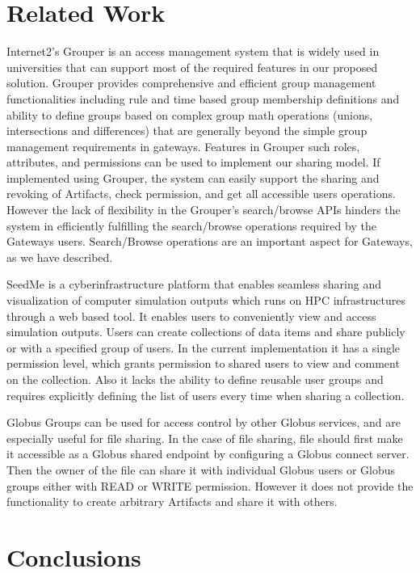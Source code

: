 \documentclass[sigconf]{acmart}
\begin{document}
\section{Related Work}

Internet2's Grouper \cite{grouperWebsite} is an access management system that is widely used in universities that can support most of the required features in our proposed solution. Grouper provides comprehensive and efficient group management functionalities including rule and time based group membership definitions and ability to define groups based on complex group math operations (unions, intersections and differences) that are generally beyond the simple group management requirements in gateways. Features in Grouper such roles, attributes, and permissions can be used to implement our sharing model. If implemented using Grouper, the system can easily support the sharing and revoking of Artifacts, check permission, and get all accessible users operations. However the lack of flexibility in the Grouper's search/browse APIs hinders the system in efficiently fulfilling the search/browse operations required by the Gateways users. Search/Browse operations are an important aspect for Gateways, as we have described.

SeedMe \cite{chourasia2013seedme} is a cyberinfrastructure platform that enables seamless sharing and visualization of computer simulation outputs which runs on HPC infrastructures through a web based tool. It enables users to conveniently view and access simulation outputs. Users can create collections of data items and share publicly or with a specified group of users. In the current implementation it has a single permission level, which grants permission to shared users to view and comment on the collection. Also it lacks the ability to define reusable user groups and requires explicitly defining the list of users every time when sharing a collection.

Globus Groups \cite{globusFileSharing} can be used for access control by other Globus services, and are especially useful for file sharing. In the case of file sharing, file should first make it accessible as a Globus shared endpoint by configuring a Globus connect server. Then the owner of the file can share it with individual Globus users or Globus groups either with READ or WRITE permission. However it does not provide the functionality to create arbitrary Artifacts and share it with others.

\section{Conclusions}
\end{document}
